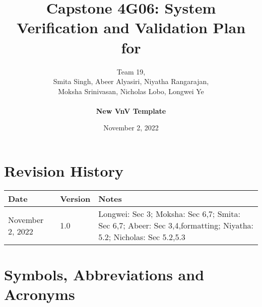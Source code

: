 \documentclass[12pt, titlepage]{article}
\begin{document}
\title{Capstone 4G06: System Verification and Validation Plan for } 
\author{Team 19,
		\\ Smita Singh, Abeer Alyasiri, Niyatha Rangarajan,\\ Moksha Srinivasan, Nicholas Lobo, Longwei Ye \\\\
		\textbf{New VnV Template}
}

\date{November 2, 2022}
	
\maketitle


\section{Revision History}

\begin{tabularx}{\textwidth}{p{3cm}p{2cm}X}
\toprule {\bf Date} & {\bf Version} & {\bf Notes}\\
\midrule
November 2, 2022 & 1.0 & Longwei: Sec 3; Moksha: Sec 6,7; Smita: Sec 6,7; Abeer: Sec 3,4,formatting; Niyatha: 5.2; Nicholas: Sec 5.2,5.3 \\
\bottomrule
\end{tabularx}

\newpage

\tableofcontents

\listoftables


\newpage

\section{Symbols, Abbreviations and Acronyms}
\end{document}
